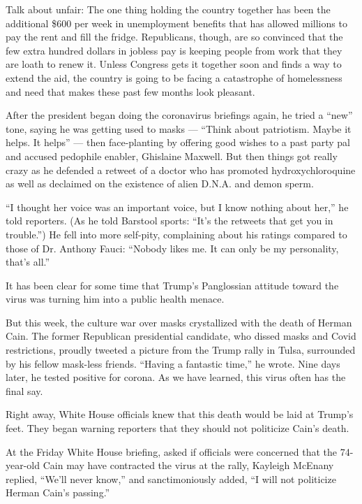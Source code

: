 Talk about unfair: The one thing holding the country together has been
the additional \$600 per week in unemployment benefits that has allowed
millions to pay the rent and fill the fridge. Republicans, though, are
so convinced that the few extra hundred dollars in jobless pay is
keeping people from work that they are loath to renew it. Unless
Congress gets it together soon and finds a way to extend the aid, the
country is going to be facing a catastrophe of homelessness and need
that makes these past few months look pleasant.

After the president began doing the coronavirus briefings again, he
tried a ``new'' tone, saying he was getting used to masks --- ``Think
about patriotism. Maybe it helps. It helps'' --- then face-planting by
offering good wishes to a past party pal and accused pedophile enabler,
Ghislaine Maxwell. But then things got really crazy as he defended a
retweet of a doctor who has promoted hydroxychloroquine as well as
declaimed on the existence of alien D.N.A. and demon sperm.

``I thought her voice was an important voice, but I know nothing about
her,'' he told reporters. (As he told Barstool sports: ``It's the
retweets that get you in trouble.'') He fell into more self-pity,
complaining about his ratings compared to those of Dr. Anthony Fauci:
``Nobody likes me. It can only be my personality, that's all.''

It has been clear for some time that Trump's Panglossian attitude toward
the virus was turning him into a public health menace.

But this week, the culture war over masks crystallized with the death of
Herman Cain. The former Republican presidential candidate, who dissed
masks and Covid restrictions, proudly tweeted a picture from the Trump
rally in Tulsa, surrounded by his fellow mask-less friends. ``Having a
fantastic time,'' he wrote. Nine days later, he tested positive for
corona. As we have learned, this virus often has the final say.

Right away, White House officials knew that this death would be laid at
Trump's feet. They began warning reporters that they should not
politicize Cain's death.

At the Friday White House briefing, asked if officials were concerned
that the 74-year-old Cain may have contracted the virus at the rally,
Kayleigh McEnany replied, ``We'll never know,'' and sanctimoniously
added, ``I will not politicize Herman Cain's passing.''


